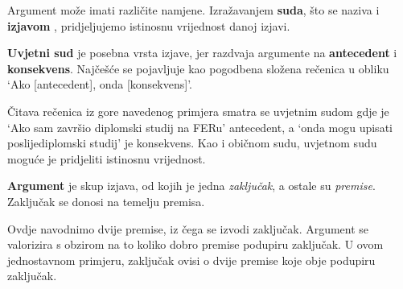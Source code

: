 Argument može imati različite namjene. Izražavanjem \textbf{suda}, što se
naziva i \textbf{izjavom} , pridjeljujemo istinosnu vrijednost
danoj izjavi. 
\vspace{2 mm}


\vspace{2 mm}
\textbf{Uvjetni sud}  je posebna vrsta izjave, jer
razdvaja argumente na \textbf{antecedent} i \textbf{konsekvens}. Najčešće se
pojavljuje kao pogodbena složena rečenica u obliku `Ako [antecedent], onda
[konsekvens]'.
\vspace{2 mm}


\vspace{2 mm}
Čitava rečenica iz gore navedenog primjera smatra se uvjetnim sudom gdje je
`Ako sam završio diplomski studij na FERu' antecedent, a `onda mogu upisati
poslijediplomski studij' je konsekvens. Kao i običnom sudu, uvjetnom sudu
moguće je pridjeliti istinosnu vrijednost. 

\textbf{Argument} je skup izjava, od kojih je jedna \emph{zaključak}, a ostale
su \emph{premise}. Zaključak se donosi na temelju premisa.
\vspace{2 mm}

\vspace{2 mm}

Ovdje navodnimo dvije premise, iz čega se izvodi zaključak. Argument se valorizira s obzirom na to koliko dobro premise podupiru zaključak. U ovom jednostavnom primjeru, zaključak ovisi o dvije premise koje obje podupiru zaključak. 

